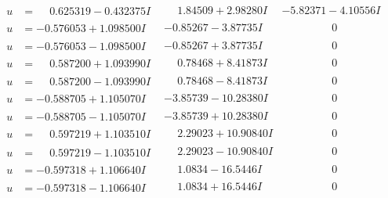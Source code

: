 \documentclass[1p]{elsarticle_modified}
\theoremstyle{definition}
\begin{document}
$$\begin{array}{c|c|c}
\begin{aligned}
u &= \phantom{-}0.625319 - 0.432375 I\end{aligned}
 & \phantom{-}1.84509 + 2.98280 I & -5.82371 - 4.10556 I \\ \hline\begin{aligned}
u &= -0.576053 + 1.098500 I\end{aligned}
 & -0.85267 - 3.87735 I & \phantom{-0.000000 } 0 \\ \hline\begin{aligned}
u &= -0.576053 - 1.098500 I\end{aligned}
 & -0.85267 + 3.87735 I & \phantom{-0.000000 } 0 \\ \hline\begin{aligned}
u &= \phantom{-}0.587200 + 1.093990 I\end{aligned}
 & \phantom{-}0.78468 + 8.41873 I & \phantom{-0.000000 } 0 \\ \hline\begin{aligned}
u &= \phantom{-}0.587200 - 1.093990 I\end{aligned}
 & \phantom{-}0.78468 - 8.41873 I & \phantom{-0.000000 } 0 \\ \hline\begin{aligned}
u &= -0.588705 + 1.105070 I\end{aligned}
 & -3.85739 - 10.28380 I & \phantom{-0.000000 } 0 \\ \hline\begin{aligned}
u &= -0.588705 - 1.105070 I\end{aligned}
 & -3.85739 + 10.28380 I & \phantom{-0.000000 } 0 \\ \hline\begin{aligned}
u &= \phantom{-}0.597219 + 1.103510 I\end{aligned}
 & \phantom{-}2.29023 + 10.90840 I & \phantom{-0.000000 } 0 \\ \hline\begin{aligned}
u &= \phantom{-}0.597219 - 1.103510 I\end{aligned}
 & \phantom{-}2.29023 - 10.90840 I & \phantom{-0.000000 } 0 \\ \hline\begin{aligned}
u &= -0.597318 + 1.106640 I\end{aligned}
 & \phantom{-}1.0834 - 16.5446 I & \phantom{-0.000000 } 0 \\ \hline\begin{aligned}
u &= -0.597318 - 1.106640 I\end{aligned}
 & \phantom{-}1.0834 + 16.5446 I & \phantom{-0.000000 } 0 \\ \hline\begin{aligned}

\end{aligned}
\end{array}$$
\end{document}
